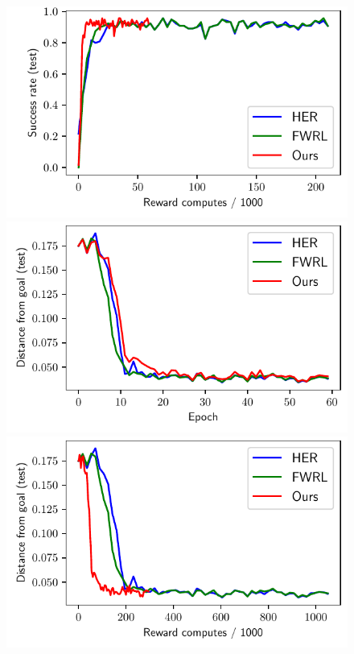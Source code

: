 \begin{figure}
  \includegraphics[width=\frac\columnwidth]{media/res/6efc1de-path_reward_low_thresh_chosen-FetchReachPR-v1-dqst/reward_computes-test/success_rate.pdf}\\
  \includegraphics[width=\frac\columnwidth]{media/res/6efc1de-path_reward_low_thresh_chosen-FetchPushPR-v1-dqst/epoch-test/ag_g_dist.pdf}%
  \includegraphics[width=\frac\columnwidth]{media/res/6efc1de-path_reward_low_thresh_chosen-FetchPushPR-v1-dqst/reward_computes-test/ag_g_dist.pdf}%

\end{figure}

